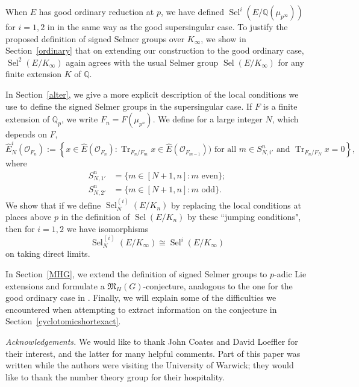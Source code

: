 \documentclass{amsart}
\newcommand{\QQ}{\mathbb Q}
\DeclareMathOperator{\Sel}{Sel}
\DeclareMathOperator{\Tr}{Tr}
\newcommand{\Qp}{\QQ_p}
\newcommand{\calO}{\mathcal{O}}
\begin{document}
  When $E$ has good ordinary reduction at $p$, we have defined $\Sel^i(E/\QQ(\mu_{p^\infty}))$ for $i=1,2$ in \cite{leiloefflerzerbes10} in the same way as the good supersingular case. To justify the proposed definition of signed Selmer groups over $K_\infty$, we show in Section~\ref{ordinary} that on extending our construction to the good ordinary case, $\Sel^2(E\slash K_\infty)$ again agrees with the usual Selmer group $\Sel(E\slash K_\infty)$ for any finite extension $K$ of $\QQ$.
  

  In Section~\ref{alter}, we give a more explicit description of the local conditions we use to define the signed Selmer groups in the supersingular case. If $F$ is a finite extension of $\Qp$, we write $F_n=F(\mu_{p^n})$. We define for a large integer $N$, which depends on $F$,
  \[
   \hat{E}_N^i(\calO_{F_n})   := \left\{x\in\hat{E}(\calO_{F_n}): \Tr_{F_n/F_m}x\in \hat{E}(\calO_{F_{m-1}}))\text{ for all }m\in S_{N,i'}^n \text{ and }\Tr_{F_n/F_N}x=0\right\},
  \]
  where
  \begin{align*}
   S_{N,1'}^n&=\{m\in[N+1,n]:m\text{ even}\};\\
   S_{N,2'}^n&=\{m\in[N+1,n]:m\text{ odd}\}.
  \end{align*}
  We show that if we define $\Sel_N^{(i)}(E/K_n)$ by replacing the local conditions at places above $p$ in the definition of $\Sel(E/K_n)$ by these ``jumping conditions", then  for $i=1,2$ we have isomorphisms
  \[
   \Sel_N^{(i)}(E/K_\infty)\cong\Sel^{i}(E/K_\infty)
  \]
  on taking direct limits.

  In Section~\ref{MHG}, we extend the definition of signed Selmer groups to $p$-adic Lie extensions and formulate a $\mathfrak{M}_H(G)$-conjecture, analogous to the one for the good ordinary case in \cite{cfksv}. Finally, we will explain some of the difficulties we encountered when attempting to extract information on the conjecture in Section~\ref{cyclotomicshortexact}.
  
  \vspace{1ex}
  
  {\it Acknowledgements.} We would like to thank John Coates and David Loeffler for their interest, and the latter for many helpful comments. Part of this paper was written while the authors were visiting the University of Warwick; they would like to thank the number theory group for their hospitality.  
  
 
 

  
\end{document}

